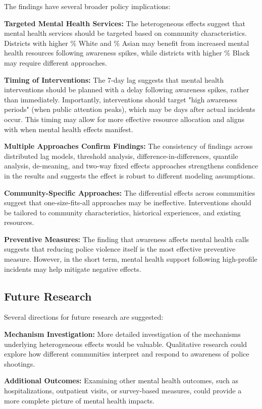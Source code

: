 \documentclass[11pt,a4paper]{article}
\begin{document}
The findings have several broader policy implications:

\textbf{Targeted Mental Health Services:} The heterogeneous effects suggest that mental health services should be targeted based on community characteristics. Districts with higher \% White and \% Asian may benefit from increased mental health resources following awareness spikes, while districts with higher \% Black may require different approaches.

\textbf{Timing of Interventions:} The 7-day lag suggests that mental health interventions should be planned with a delay following awareness spikes, rather than immediately. Importantly, interventions should target "high awareness periods" (when public attention peaks), which may be days after actual incidents occur. This timing may allow for more effective resource allocation and aligns with when mental health effects manifest.

\textbf{Multiple Approaches Confirm Findings:} The consistency of findings across distributed lag models, threshold analysis, difference-in-differences, quantile analysis, de-meaning, and two-way fixed effects approaches strengthens confidence in the results and suggests the effect is robust to different modeling assumptions.

\textbf{Community-Specific Approaches:} The differential effects across communities suggest that one-size-fits-all approaches may be ineffective. Interventions should be tailored to community characteristics, historical experiences, and existing resources.

\textbf{Preventive Measures:} The finding that awareness affects mental health calls suggests that reducing police violence itself is the most effective preventive measure. However, in the short term, mental health support following high-profile incidents may help mitigate negative effects.

\subsection{Future Research}

Several directions for future research are suggested:

\textbf{Mechanism Investigation:} More detailed investigation of the mechanisms underlying heterogeneous effects would be valuable. Qualitative research could explore how different communities interpret and respond to awareness of police shootings.

\textbf{Additional Outcomes:} Examining other mental health outcomes, such as hospitalizations, outpatient visits, or survey-based measures, could provide a more complete picture of mental health impacts.
\end{document}

